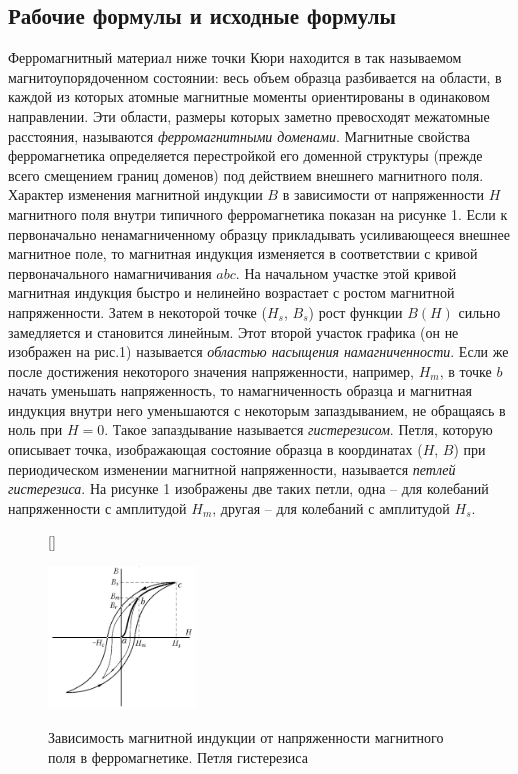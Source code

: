 \documentclass[12pt, a4paper]{article}
\begin{document}
\subsection*{Рабочие формулы и исходные формулы}

Ферромагнитный материал ниже точки Кюри находится в так называемом
магнитоупорядоченном состоянии: весь объем образца разбивается на области,
в каждой из которых атомные магнитные моменты ориентированы в
одинаковом направлении. Эти области, размеры которых заметно превосходят
межатомные расстояния, называются \textit{ферромагнитными доменами}.
Магнитные свойства ферромагнетика определяется перестройкой его доменной
структуры (прежде всего смещением границ доменов) под действием внешнего
магнитного поля. Характер изменения магнитной индукции $B$ в зависимости от
напряженности $H$ магнитного поля внутри типичного ферромагнетика показан
на рисунке 1. Если к первоначально ненамагниченному образцу прикладывать
усиливающееся внешнее магнитное поле, то магнитная индукция изменяется в
соответствии с кривой первоначального намагничивания $abc$. На начальном
участке этой кривой магнитная индукция быстро и нелинейно возрастает с
ростом магнитной напряженности. Затем в некоторой точке ($H_s$, $B_s$) рост
функции $B(H)$ сильно замедляется и становится линейным. Этот второй участок
графика (он не изображен на рис.1) называется \textit{областью насыщения
намагниченности}. Если же после достижения некоторого значения
напряженности, например, $H_m$, в точке $b$ начать уменьшать напряженность, то
намагниченность образца и магнитная индукция внутри него уменьшаются с
некоторым запаздыванием, не обращаясь в ноль при $H = 0$. Такое запаздывание
называется \textit{гистерезисом}. Петля, которую описывает точка, изображающая
состояние образца в координатах ($H$, $B$) при периодическом изменении
магнитной напряженности, называется \textit{петлей гистерезиса}. На рисунке 1
изображены две таких петли, одна – для колебаний напряженности с
амплитудой $H_m$, другая – для колебаний с амплитудой $H_s$.

\begin{figure}[H]
[\FBwidth]
{\caption{Зависимость магнитной индукции от напряженности магнитного поля в ферромагнетике. Петля гистерезиса}}
{\includegraphics[width=0.35\textwidth]{lab4.png}}
\end{figure}
\end{document}
